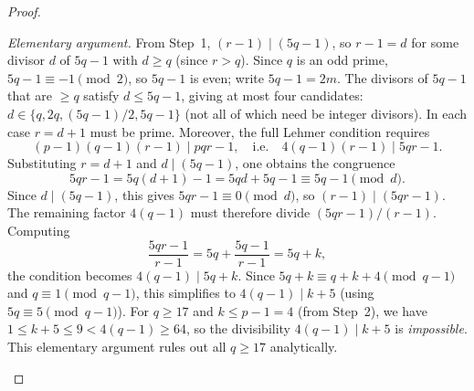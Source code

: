 \documentclass[12pt,a4paper]{amsart}
\theoremstyle{definition}
\begin{document}
\begin{proof}
\begin{itemize}
\begin{itemize}
                \textit{Elementary argument.}
                From Step~1, $(r-1) \mid (5q - 1)$, so $r - 1 = d$ for some
                divisor $d$ of $5q - 1$ with $d \ge q$ (since $r > q$).
                Since $q$ is an odd prime, $5q - 1 \equiv -1 \pmod{2}$, so
                $5q - 1$ is even; write $5q - 1 = 2m$.
                The divisors of $5q - 1$ that are $\ge q$ satisfy
                $d \le 5q - 1$, giving at most four candidates:
                $d \in \{q, 2q, (5q-1)/2, 5q-1\}$ (not all of which need be
                integer divisors).
                In each case $r = d + 1$ must be prime.  Moreover, the full
                Lehmer condition requires
                \[
                  (p-1)(q-1)(r-1) \;\Big|\; pqr - 1,
                  \quad\text{i.e.}\quad
                  4(q-1)(r-1) \;\Big|\; 5qr - 1.
                \]
                Substituting $r = d + 1$ and $d \mid (5q-1)$, one obtains the
                congruence
                \[
                  5qr - 1 = 5q(d+1) - 1 = 5qd + 5q - 1 \equiv 5q - 1
                  \pmod{d}.
                \]
                Since $d \mid (5q-1)$, this gives $5qr - 1 \equiv 0 \pmod{d}$,
                so $(r-1) \mid (5qr-1)$.  The remaining factor $4(q-1)$
                must therefore divide $(5qr-1)/(r-1)$.  Computing
                \[
                  \frac{5qr-1}{r-1} = 5q + \frac{5q-1}{r-1} = 5q + k,
                \]
                the condition becomes $4(q-1) \mid 5q + k$.  Since
                $5q + k \equiv q + k + 4 \pmod{q-1}$ and $q \equiv 1 \pmod{q-1}$,
                this simplifies to $4(q-1) \mid k + 5$
                (using $5q \equiv 5 \pmod{q-1}$).
                For $q \ge 17$ and $k \le p - 1 = 4$ (from Step~2), we have
                $1 \le k + 5 \le 9 < 4(q-1) \ge 64$, so the divisibility
                $4(q-1) \mid k + 5$ is \emph{impossible}.
                This elementary argument rules out all $q \ge 17$ analytically.


\end{itemize}
\end{itemize}
\end{proof}
\end{document}
